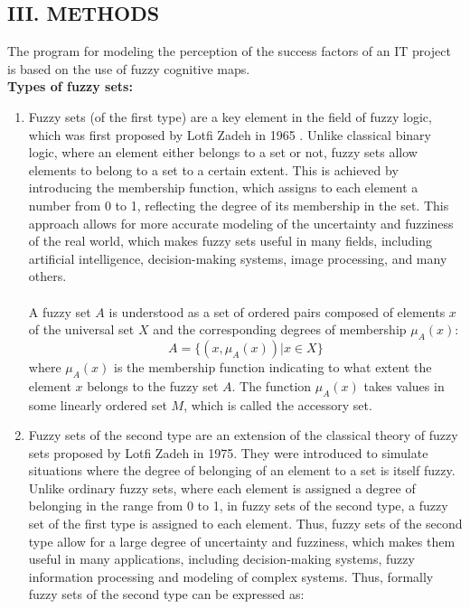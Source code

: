\documentclass{article}
\begin{document}
\begin{minipage}{0.49\textwidth}
\begin{center}
        \chapter{III. METHODS}
        \end{center}
        The program for modeling the perception of the success factors of an IT project is based on the use of fuzzy cognitive maps.\\
        \textbf{Types of fuzzy sets:}
        \begin{enumerate}
            \item Fuzzy sets (of the first type) are a key element in the field of fuzzy logic, which was first proposed by Lotfi Zadeh in 1965 \cite{litlink21}. Unlike classical binary logic, where an element either belongs to a set or not, fuzzy sets allow elements to belong to a set to a certain extent. This is achieved by introducing the membership function, which assigns to each element a number from 0 to 1, reflecting the degree of its membership in the set. This approach allows for more accurate modeling of the uncertainty and fuzziness of the real world, which makes fuzzy sets useful in many fields, including artificial intelligence, decision-making systems, image processing, and many others.\\
            ~\\
            A fuzzy set $A$ is understood as a set of ordered pairs composed of elements $x$ of the universal set $X$ and the corresponding degrees of membership $\mu_A(x)$:\\
            $$A=\{(x, \mu_A(x)) | x \in X\}$$
            where $\mu_A(x)$ is the membership function indicating to what extent the element $x$ belongs to the fuzzy set $A$. The function $\mu_A(x)$ takes values in some linearly ordered set $M$, which is called the accessory set.
            \item Fuzzy sets of the second type are an extension of the classical theory of fuzzy sets proposed by Lotfi Zadeh in 1975. They were introduced to simulate situations where the degree of belonging of an element to a set is itself fuzzy. Unlike ordinary fuzzy sets, where each element is assigned a degree of belonging in the range from 0 to 1, in fuzzy sets of the second type, a fuzzy set of the first type is assigned to each element. Thus, fuzzy sets of the second type allow for a large degree of uncertainty and fuzziness, which makes them useful in many applications, including decision-making systems, fuzzy information processing and modeling of complex systems. Thus, formally fuzzy sets of the second type can be expressed as:

\end{enumerate}
\end{minipage}
\end{document}
